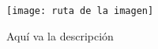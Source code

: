 \begin{figure}[!htbp]
    \centering
    \texttt{[image: ruta de la imagen]}
    \caption{Aquí va la descripción}
    \label{fig:fig1.1}
\end{figure}
